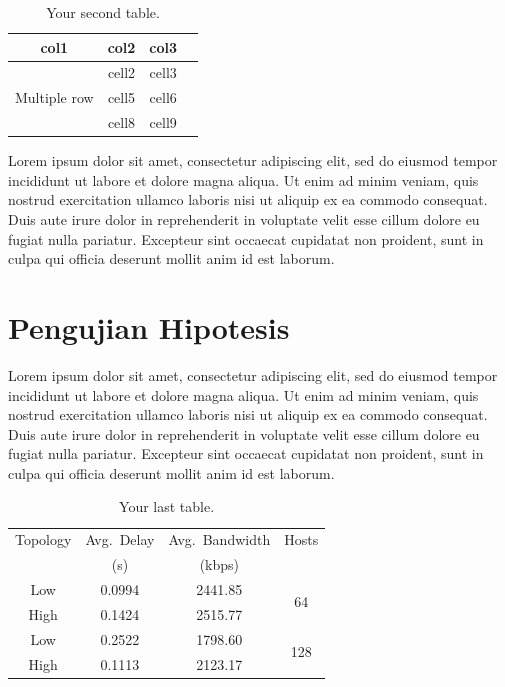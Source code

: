 \documentclass[12pt,hidelinks]{report}
\begin{document}
\begin{table}[h!]
\begin{center}
    \caption{Your second table.}
    \label{tab:table2}
\begin{tabular}{ |c|c|c|c| } 
\hline
col1 & col2 & col3 \\
\hline
\multirow{3}{4em}{Multiple row} & cell2 & cell3 \\  %
& cell5 & cell6 \\ 
& cell8 & cell9 \\ 
\hline
\end{tabular}
\end{center}
\end{table}

    Lorem ipsum dolor sit amet, consectetur adipiscing elit, sed do eiusmod tempor incididunt ut labore et dolore magna aliqua. Ut enim ad minim veniam, quis nostrud exercitation ullamco laboris nisi ut aliquip ex ea commodo consequat. Duis aute irure dolor in reprehenderit in voluptate velit esse cillum dolore eu fugiat nulla pariatur. Excepteur sint occaecat cupidatat non proident, sunt in culpa qui officia deserunt mollit anim id est laborum. 

\section{Pengujian Hipotesis}
    Lorem ipsum dolor sit amet, consectetur adipiscing elit, sed do eiusmod tempor incididunt ut labore et dolore magna aliqua. Ut enim ad minim veniam, quis nostrud exercitation ullamco laboris nisi ut aliquip ex ea commodo consequat. Duis aute irure dolor in reprehenderit in voluptate velit esse cillum dolore eu fugiat nulla pariatur. Excepteur sint occaecat cupidatat non proident, sunt in culpa qui officia deserunt mollit anim id est laborum. 
 
\begin{table}[h!]
\begin{center}
    \caption{Your last table.}
    \label{tab:table3}
\begin{tabular}{@{} cccc @{}}
\toprule
Topology & Avg.\ Delay & Avg.\ Bandwidth & Hosts \\
& (s) & (kbps) & \\
\midrule
Low & 0.0994 & 2441.85 & \multirow{2}{*}{64} \\
High & 0.1424 & 2515.77  & \\[2ex]
Low & 0.2522 & 1798.60 & \multirow{2}{*}{128} \\
High & 0.1113 & 2123.17  & \\
\bottomrule
\end{tabular}
\end{center}
\end{table}
\end{document}
